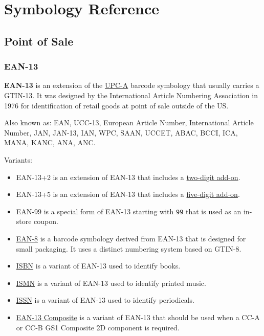 \hypertarget{symbology-reference}{%
\section{Symbology Reference}\label{symbology-reference}}

\hypertarget{point-of-sale}{%
\subsection{Point of Sale}\label{point-of-sale}}

\hypertarget{ean-13}{%
\subsubsection{EAN-13}\label{ean-13}}

\textbf{EAN-13} is an extension of the \protect\hyperlink{upc-a}{UPC-A}
barcode symbology that usually carries a GTIN-13. It was designed by the
International Article Numbering Association in 1976 for identification
of retail goods at point of sale outside of the US.


Also known as: EAN, UCC-13, European Article Number, International
Article Number, JAN, JAN-13, IAN, WPC, SAAN, UCCET, ABAC, BCCI, ICA,
MANA, KANC, ANA, ANC.

Variants:

\begin{itemize}
\tightlist
\item
  EAN-13+2 is an extension of EAN-13 that includes a
  \protect\hyperlink{ean-2}{two-digit add-on}.
\item
  EAN-13+5 is an extension of EAN-13 that includes a
  \protect\hyperlink{ean-5}{five-digit add-on}.
\item
  EAN-99 is a special form of EAN-13 starting with \texttt{99} that is
  used as an in-store coupon.
\item
  \protect\hyperlink{ean-8}{EAN-8} is a barcode symbology derived from
  EAN-13 that is designed for small packaging. It uses a distinct
  numbering system based on GTIN-8.
\item
  \protect\hyperlink{isbn}{ISBN} is a variant of EAN-13 used to identify
  books.
\item
  \protect\hyperlink{ismn}{ISMN} is a variant of EAN-13 used to identify
  printed music.
\item
  \protect\hyperlink{issn}{ISSN} is a variant of EAN-13 used to identify
  periodicals.
\item
  \protect\hyperlink{gs1-composite-symbols}{EAN-13 Composite} is a
  variant of EAN-13 that should be used when a CC-A or CC-B GS1
  Composite 2D component is required.
\end{itemize}

